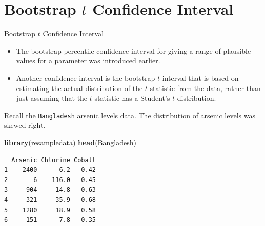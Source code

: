 \documentclass[
  ignorenonframetext,
]{beamer}
\newenvironment{Shaded}{\begin{snugshade}}{\end{snugshade}}
\newcommand{\FunctionTok}[1]{\textcolor[rgb]{0.13,0.29,0.53}{\textbf{#1}}}
\newcommand{\NormalTok}[1]{#1}
\begin{document}
\hypertarget{bootstrap-t-confidence-interval}{%
\section{\texorpdfstring{Bootstrap \(t\) Confidence
Interval}{Bootstrap t Confidence Interval}}\label{bootstrap-t-confidence-interval}}

\begin{frame}[fragile]{Bootstrap \(t\) Confidence Interval}
\protect\hypertarget{bootstrap-t-confidence-interval-1}{}
\begin{itemize}
\item
  The bootstrap percentile confidence interval for giving a range of
  plausible values for a parameter was introduced earlier.
\item
  Another confidence interval is the bootstrap \(t\) interval that is
  based on estimating the actual distribution of the \(t\) statistic
  from the data, rather than just assuming that the \(t\) statistic has
  a Student's \(t\) distribution.
\end{itemize}

Recall the \texttt{Bangladesh} arsenic levels data. The distribution of
arsenic levels was skewed right.

\tiny

\begin{Shaded}
\begin{Highlighting}[]
\FunctionTok{library}\NormalTok{(resampledata)}
\FunctionTok{head}\NormalTok{(Bangladesh)}
\end{Highlighting}
\end{Shaded}

\begin{verbatim}
  Arsenic Chlorine Cobalt
1    2400      6.2   0.42
2       6    116.0   0.45
3     904     14.8   0.63
4     321     35.9   0.68
5    1280     18.9   0.58
6     151      7.8   0.35
\end{verbatim}

\normalsize
\end{frame}
\end{document}
